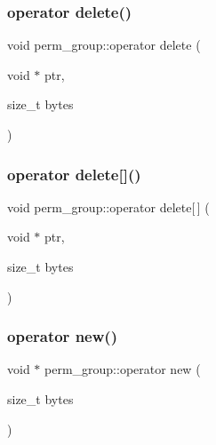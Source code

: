 \subsubsection{\texorpdfstring{operator delete()}{operator delete()}}
{\footnotesize\ttfamily void perm\+\_\+group\+::operator delete (\begin{DoxyParamCaption}\item[{void $\ast$}]{ptr,  }\item[{size\+\_\+t}]{bytes }\end{DoxyParamCaption})}

\mbox{\label{classperm__group_ae18ceca5324c549296b04ea3f8351fe8}} 
\subsubsection{\texorpdfstring{operator delete[]()}{operator delete[]()}}
{\footnotesize\ttfamily void perm\+\_\+group\+::operator delete\mbox{[}$\,$\mbox{]} (\begin{DoxyParamCaption}\item[{void $\ast$}]{ptr,  }\item[{size\+\_\+t}]{bytes }\end{DoxyParamCaption})}

\mbox{\label{classperm__group_abc983a33e0bb57238ba9c675127b3e17}} 
\subsubsection{\texorpdfstring{operator new()}{operator new()}}
{\footnotesize\ttfamily void $\ast$ perm\+\_\+group\+::operator new (\begin{DoxyParamCaption}\item[{size\+\_\+t}]{bytes }\end{DoxyParamCaption})}

\mbox{\label{classperm__group_a0ec21707d8b438d62b3ba25b9542fa1e}} 
